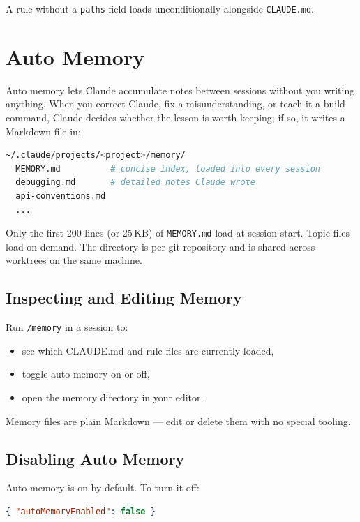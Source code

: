 A rule without a \texttt{paths} field loads unconditionally alongside
\texttt{CLAUDE.md}.

\section{Auto Memory}
\label{sec:auto-memory}


Auto memory lets Claude accumulate notes between sessions without you writing
anything. When you correct Claude, fix a misunderstanding, or teach it a
build command, Claude decides whether the lesson is worth keeping; if so, it
writes a Markdown file in:

\begin{lstlisting}[language=bash,caption={Auto-memory storage location}]
~/.claude/projects/<project>/memory/
  MEMORY.md          # concise index, loaded into every session
  debugging.md       # detailed notes Claude wrote
  api-conventions.md
  ...
\end{lstlisting}

Only the first 200 lines (or 25\,KB) of \texttt{MEMORY.md} load at session
start. Topic files load on demand. The directory is per git repository and
is shared across worktrees on the same machine.

\subsection{Inspecting and Editing Memory}

Run \texttt{/memory} in a session to:
\begin{itemize}
  \item see which CLAUDE.md and rule files are currently loaded,
  \item toggle auto memory on or off,
  \item open the memory directory in your editor.
\end{itemize}

Memory files are plain Markdown — edit or delete them with no special tooling.

\subsection{Disabling Auto Memory}

Auto memory is on by default. To turn it off:

\begin{lstlisting}[language=json,caption={Disabling auto memory in \texttt{.claude/settings.json}}]
{ "autoMemoryEnabled": false }
\end{lstlisting}

